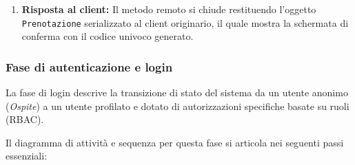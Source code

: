 \documentclass{article}
\begin{document}
\begin{enumerate}
    \item \textbf{Risposta al client:} Il metodo remoto si chiude restituendo l'oggetto \texttt{Prenotazione} serializzato al client originario, il quale mostra la schermata di conferma con il codice univoco generato.
\end{enumerate}

\subsubsection{Fase di autenticazione e login}
La fase di login descrive la transizione di stato del sistema da un utente anonimo (\textit{Ospite}) a un utente profilato e dotato di autorizzazioni specifiche basate su ruoli (RBAC).

Il diagramma di attività e sequenza per questa fase si articola nei seguenti passi essenziali:
\end{document}
